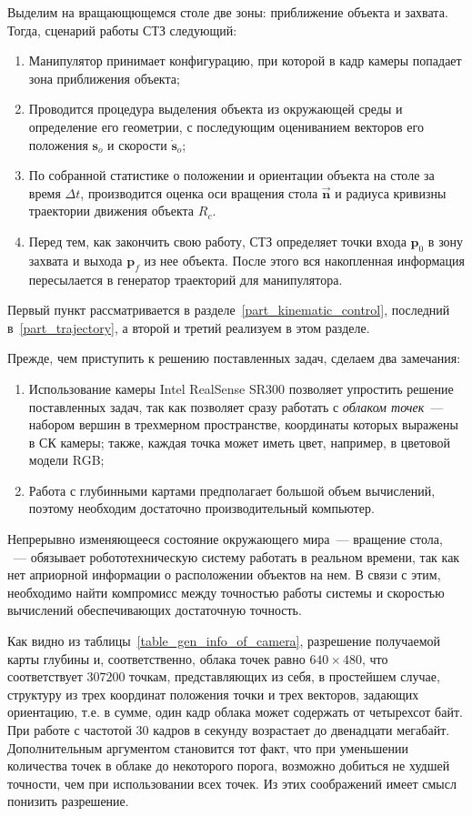 Выделим на вращающющемся столе две зоны: приближение объекта и захвата.
Тогда, сценарий работы СТЗ следующий:
\begin{enumerate}
	\item Манипулятор принимает конфигурацию, при которой в кадр камеры попадает зона приближения объекта;
	\item Проводится процедура выделения объекта из окружающей среды и  определение его геометрии, с последующим оцениванием векторов его положения $ \bm{s}_o $ и скорости $ \dot{\bm{s}}_o $;
	\item По собранной статистике о положении и ориентации объекта на столе за время $ \Delta t $, производится оценка оси вращения стола ${\overrightarrow{\bm{n}}}$ и радиуса кривизны траектории движения объекта $ R_c $.
	\item Перед тем, как закончить свою работу, СТЗ определяет точки входа $ \bm{p}_0 $ в зону захвата и выхода $ \bm{p}_f $ из нее объекта. После этого вся накопленная информация пересылается в генератор траекторий для манипулятора.
\end{enumerate}

Первый пункт рассматривается в разделе~\ref{part_kinematic_control}, последний в~\ref{part_trajectory}, а второй и третий реализуем в этом разделе. 

Прежде, чем приступить к решению поставленных задач, сделаем два замечания:
\begin{enumerate}
	\item Использование камеры Intel RealSense SR300 позволяет упростить решение поставленных задач, так как позволяет сразу работать с \textit{облаком точек}~--- набором вершин в трехмерном пространстве, координаты которых выражены в СК камеры; также, каждая точка может иметь цвет, например, в цветовой модели RGB;
	\item Работа с глубинными картами предполагает большой объем вычислений, поэтому необходим достаточно производительный компьютер.
\end{enumerate}

Непрерывно изменяющееся состояние окружающего мира~--- вращение стола, ~--- обязывает робототехническую систему работать в реальном времени, так как нет априорной информации о расположении объектов на нем. В связи с этим, необходимо найти компромисс между точностью работы системы и скоростью  вычислений обеспечивающих достаточную точность.

Как видно из таблицы~\ref{table_gen_info_of_camera}, разрешение получаемой карты глубины и, соответственно, облака точек равно $ 640 \times 480 $, что соответствует $ 307200$ точкам, представляющих из себя, в простейшем случае, структуру из трех координат положения точки и трех векторов, задающих ориентацию, т.е. в сумме, один кадр облака может содержать от четырехсот байт. При работе с частотой 30 кадров в секунду возрастает до двенадцати мегабайт. Дополнительным аргументом становится тот факт, что при уменьшении количества точек в облаке до некоторого порога, возможно добиться не худшей точности, чем при использовании всех точек. Из этих соображений имеет смысл понизить разрешение.

